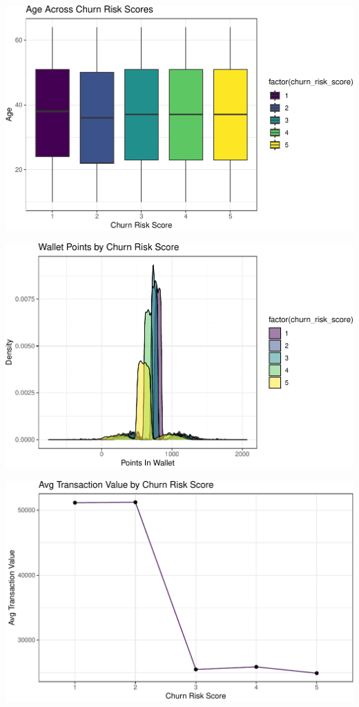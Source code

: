 \documentclass[
  letterpaper,
  DIV=11,
  numbers=noendperiod]{scrartcl}
\begin{document}
\begin{center}
\includegraphics{FPCP4_files/figure-pdf/unnamed-chunk-27-1.pdf}
\end{center}

\begin{center}
\includegraphics{FPCP4_files/figure-pdf/unnamed-chunk-28-1.pdf}
\end{center}

\begin{center}
\includegraphics{FPCP4_files/figure-pdf/unnamed-chunk-29-1.pdf}
\end{center}
\end{document}
